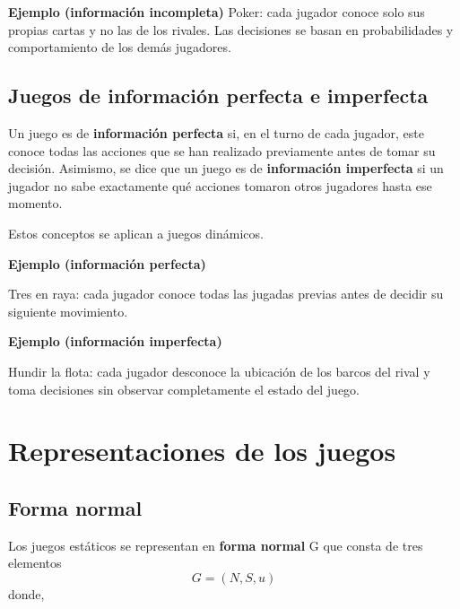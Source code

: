 \documentclass[12pt,a4paper,]{book}
\numberwithin{dummy}{section}
\theoremstyle{ocrenumbox}
\theoremstyle{blacknumex}
\theoremstyle{blacknumbox}
\theoremstyle{ocrenum}
\theoremstyle{ocrenum}
\begin{document}
\begin{tcolorbox}[colback=blue!10]
\textbf{Ejemplo (información incompleta)}
Poker: cada jugador conoce solo sus propias cartas y no las de los rivales.
Las decisiones se basan en probabilidades y comportamiento de los demás jugadores.
\end{tcolorbox}

\subsection{Juegos de información perfecta e
imperfecta}\label{juegos-de-informaciuxf3n-perfecta-e-imperfecta}

Un juego es de \textbf{información perfecta} si, en el turno de cada
jugador, este conoce todas las acciones que se han realizado previamente
antes de tomar su decisión. Asimismo, se dice que un juego es de
\textbf{información imperfecta} si un jugador no sabe exactamente qué
acciones tomaron otros jugadores hasta ese momento.

Estos conceptos se aplican a juegos dinámicos.

\begin{tcolorbox}[colback=blue!10]
\textbf{Ejemplo (información perfecta)}

Tres en raya: cada jugador conoce todas las jugadas previas antes de decidir su siguiente movimiento.
\end{tcolorbox}

\begin{tcolorbox}[colback=blue!10]
\textbf{Ejemplo (información imperfecta)}

Hundir la flota: cada jugador desconoce la ubicación de los barcos del rival y toma decisiones sin observar completamente el estado del juego.
\end{tcolorbox}

\section{Representaciones de los
juegos}\label{representaciones-de-los-juegos}

\subsection{Forma normal}\label{forma-normal}

Los juegos estáticos se representan en \textbf{forma normal} G que
consta de tres elementos \[G = (N,S,u)\] donde,
\end{document}
